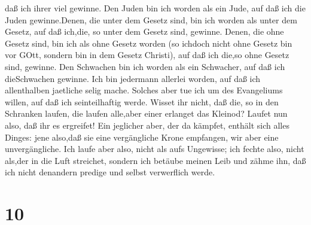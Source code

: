 daß ich ihrer viel gewinne.  Den Juden bin ich worden als
ein Jude, auf daß ich die Juden gewinne.Denen, die unter dem Gesetz
sind, bin ich worden als unter dem Gesetz, auf daß ich,die, so unter dem
Gesetz sind, gewinne.  Denen, die ohne Gesetz sind, bin ich
als ohne Gesetz worden (so ichdoch nicht ohne Gesetz bin vor GOtt,
sondern bin in dem Gesetz Christi), auf daß ich die,so ohne Gesetz sind,
gewinne.  Den Schwachen bin ich worden als ein Schwacher,
auf daß ich dieSchwachen gewinne. Ich bin jedermann allerlei worden, auf
daß ich allenthalben jaetliche selig mache.  Solches aber
tue ich um des Evangeliums willen, auf daß ich seinteilhaftig werde.
 Wisset ihr nicht, daß die, so in den Schranken laufen, die
laufen alle,aber einer erlanget das Kleinod? Laufet nun also, daß ihr es
ergreifet!  Ein jeglicher aber, der da kämpfet, enthält
sich alles Dinges: jene also,daß sie eine vergängliche Krone empfangen,
wir aber eine unvergängliche.  Ich laufe aber also, nicht
als aufs Ungewisse; ich fechte also, nicht als,der in die Luft
streichet,  sondern ich betäube meinen Leib und zähme ihn,
daß ich nicht denandern predige und selbst verwerflich werde.

\hypertarget{section-9}{%
\section{10}\label{section-9}}


